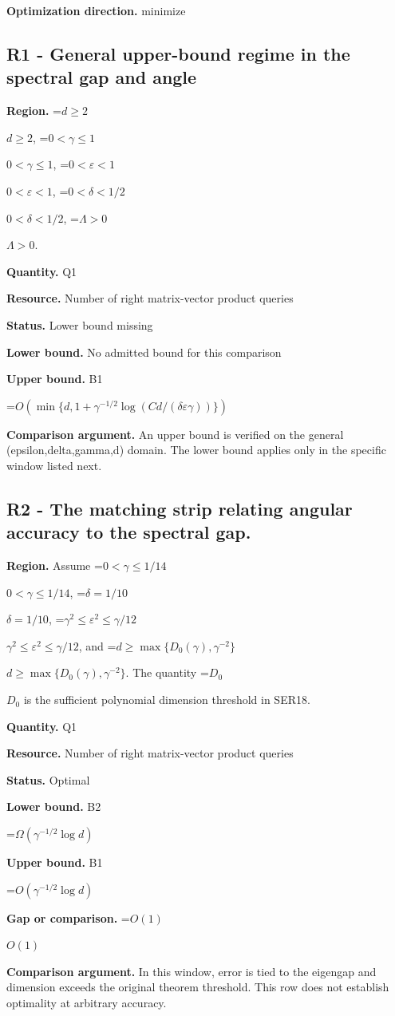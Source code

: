 \documentclass[10pt,a4paper]{article}
\newcommand{\AtlasMath}[1]{\par\begingroup\centering\setbox0=\hbox{$\displaystyle #1$}\ifdim\wd0>1.4\linewidth\typeout{ATLAS WIDE FORMULA: \the\wd0}\fi\ifdim\wd0>\linewidth\resizebox{\linewidth}{!}{\box0}\else\box0\fi\par\endgroup}
\newcommand{\AtlasInlineMath}[1]{\begingroup\setbox0=\hbox{$#1$}\ifdim\wd0>.4\linewidth\endgroup\AtlasMath{#1}\else\endgroup$#1$\fi}
\begin{document}
\textbf{Optimization direction.} minimize

\subsection{R1 - General upper-bound regime in the spectral gap and angle}
\textbf{Region.} \AtlasInlineMath{d\ge2}, \AtlasInlineMath{0<\gamma\le1}, \AtlasInlineMath{0<\varepsilon<1}, \AtlasInlineMath{0<\delta<1/2}, \AtlasInlineMath{\Lambda>0}.

\textbf{Quantity.} Q1

\textbf{Resource.} Number of right matrix-vector product queries

\textbf{Status.} Lower bound missing

\textbf{Lower bound.} No admitted bound for this comparison

\textbf{Upper bound.} B1

\AtlasMath{O\!\left(\min\{d,1+\gamma^{-1/2}\log(Cd/(\delta\varepsilon\gamma))\}\right)}
\textbf{Comparison argument.} An upper bound is verified on the general (epsilon,delta,gamma,d) domain. The lower bound applies only in the specific window listed next.

\subsection{R2 - The matching strip relating angular accuracy to the spectral gap.}
\textbf{Region.} Assume \AtlasInlineMath{0<\gamma\le1/14}, \AtlasInlineMath{\delta=1/10}, \AtlasInlineMath{\gamma^2\le\varepsilon^2\le\gamma/12}, and \AtlasInlineMath{d\ge\max\{D_0(\gamma),\gamma^{-2}\}}. The quantity \AtlasInlineMath{D_0} is the sufficient polynomial dimension threshold in SER18.

\textbf{Quantity.} Q1

\textbf{Resource.} Number of right matrix-vector product queries

\textbf{Status.} Optimal

\textbf{Lower bound.} B2

\AtlasMath{\Omega(\gamma^{-1/2}\log d)}
\textbf{Upper bound.} B1

\AtlasMath{O(\gamma^{-1/2}\log d)}
\textbf{Gap or comparison.} \AtlasInlineMath{O(1)}

\textbf{Comparison argument.} In this window, error is tied to the eigengap and dimension exceeds the original theorem threshold. This row does not establish optimality at arbitrary accuracy.
\end{document}
